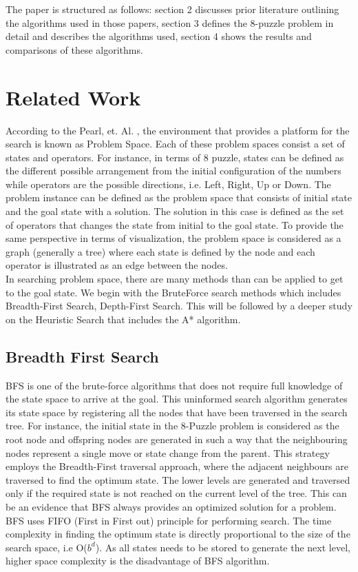 \documentclass{svproc}
\begin{document}
\noindent The paper is structured as follows: section 2 discusses prior literature outlining the algorithms used in those papers,  section 3 defines the 8-puzzle problem in detail and describes the algorithms used, section 4 shows the results and comparisons of these algorithms.

\section{Related Work}
\noindent According to the Pearl, et. Al. , the environment that provides a platform for the search is known as Problem Space. Each of these problem spaces consist a set of states and operators. For instance, in terms of 8 puzzle, states can be defined as the different possible arrangement from the initial configuration of the numbers while operators are the possible directions, i.e. Left, Right, Up or Down. The problem instance can be defined as the problem space that consists of initial state and the goal state with a solution. The solution in this case is defined as the set of operators that changes the state from initial to the goal state. To provide the same perspective in terms of visualization, the problem space is considered as a graph (generally a tree) where each state is defined by the node and each operator is illustrated as an edge between the nodes. \\

\noindent In searching problem space, there are many methods than can be applied to get to the goal state. We begin with the BruteForce search methods which includes Breadth-First Search, Depth-First Search. This will be followed by a deeper study on the Heuristic Search that includes the A* algorithm.

\subsection{Breadth First Search}
\noindent BFS is one of the brute-force algorithms that does not require full knowledge of the state space to arrive at the goal. This uninformed search algorithm generates its state space by registering all the nodes that have been traversed in the search tree. For instance, the initial state in the 8-Puzzle problem is considered as the root node and offspring nodes are generated in such a way that the neighbouring nodes represent a single move or state change from the parent. This strategy employs the Breadth-First traversal approach, where the adjacent neighbours are traversed to find the optimum state. The lower levels are generated and traversed only if the required state is not reached on the current level of the tree. This can be an evidence that BFS always provides an optimized solution for a problem. BFS uses FIFO (First in First out) principle for performing search. The time complexity in finding the optimum state is directly proportional to the size of the search space, i.e O($b^{d}$). As all states needs to be stored to generate the next level, higher space complexity is the disadvantage of BFS algorithm.
\end{document}

